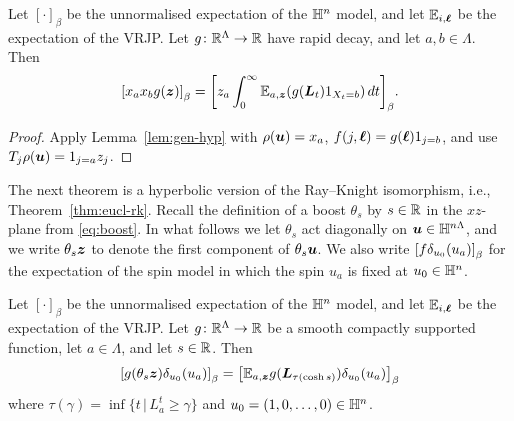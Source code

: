 \documentclass[11pt,a4paper]{article}
\begin{document}
\begin{theorem}
  \label{thm:BHS}
  Let $[\cdot]_\beta$ be the unnormalised expectation of the $\mathbb{H}^n$
  model, and let $\mathbb{E}_{i,\boldsymbol{\ell}}$ be the expectation of the VRJP.
  Let $g \colon \mathbb{R}^{\Lambda}\to \mathbb{R}$ have rapid decay, and let
  $a, b\in\Lambda$. Then
  \begin{equation}
    \label{eq:BHS}
    \uspin{x_{a}x_{b}
      g(\V{z})}_{\beta} =
    \uspin{z_{a}\int_{0}^{\infty} \E_{a,\V{z}}(g(\V{L}_{t})1_{X_t = b})\,dt}_{\beta}.
  \end{equation}
\end{theorem}

\begin{proof}
  Apply Lemma~\ref{lem:gen-hyp} with $\rho(\boldsymbol{u}) = x_a$,
  $f(j,\boldsymbol{\ell}) = g(\boldsymbol{\ell})1_{j=b}$, and use
  $T_j\rho(\boldsymbol{u}) = 1_{j=a}z_j$.
\end{proof}

The next theorem is a hyperbolic version of the Ray--Knight
isomorphism, i.e., Theorem~\ref{thm:eucl-rk}.  Recall the definition
of a boost $\theta_{s}$ by $s\in\mathbb{R}$ in the $xz$-plane from
\eqref{eq:boost}. In what follows we let $\theta_{s}$ act diagonally
on $\boldsymbol{u}\in \mathbb{H}^{n\Lambda}$, and we write $\theta_{s}\boldsymbol{z}$ to
denote the first component of $\theta_{s}\boldsymbol{u}$.
We also write $\cb{f\delta_{u_{0}}(u_{a})}_{\beta}$ for the expectation of the
spin model in which the spin $u_{a}$ is fixed at $u_{0}\in\mathbb{H}^{n}$.

\begin{theorem}
  \label{thm:hyp-rk}
  Let $[\cdot]_\beta$ be the unnormalised expectation of the $\mathbb{H}^n$ model, and let $\mathbb{E}_{i,\boldsymbol{\ell}}$ be the expectation of the VRJP.
  Let $g\colon\mathbb{R}^{\Lambda}\to\mathbb{R}$ be a smooth compactly supported function,
  let $a\in\Lambda$, and let $s\in\mathbb{R}$.  Then
  \begin{equation}
    \label{eq:hyp-rk}
    \uspin{ g(\theta_s\bm{z})\delta_{ u_0}(u_a)}_\beta = \uspin{  \E_{a,\V{z}}g(\bm{L}_{\tau(\cosh{s})})\delta_{u_0}(u_a)}_\beta
  \end{equation}
  where $\tau(\gamma) = \inf \{t \,| \,L_a^t \ge \gamma\}$ and
  $u_0=(1,0,\dots,0) \in \mathbb{H}^n$.
\end{theorem}
\end{document}
